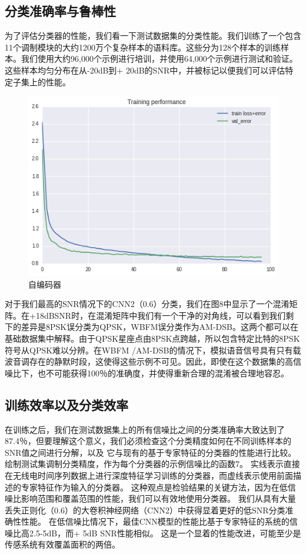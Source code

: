 \subsection{分类准确率与鲁棒性}
为了评估分类器的性能，我们看一下测试数据集的分类性能。我们训练了一个包含11个调制模块的大约1200万个复杂样本的语料库。这些分为128个样本的训练样本。我们使用大约96,000个示例进行培训，并使用64,000个示例进行测试和验证。 这些样本均匀分布在从-20dB到+ 20dB的SNR中，并被标记以便我们可以评估特定子集上的性能。\par
\begin{figure}[!h]
	\centering
	\includegraphics[scale=0.3]{figures/chapter_3/loss}
	\caption{自编码器}	\label{fig_3_2}
\end{figure}
对于我们最高的SNR情况下的CNN2（0.6）分类，我们在图8中显示了一个混淆矩阵。在+18dBSNR时，在混淆矩阵中我们有一个干净的对角线，可以看到我们剩下的差异是8PSK误分类为QPSK，WBFM误分类作为AM-DSB。这两个都可以在基础数据集中解释。由于QPSK星座点由8PSK点跨越，所以包含特定比特的8PSK符号从QPSK难以分辨。在WBFM /AM-DSB的情况下，模拟语音信号具有只有载波音调存在的静默时段，这使得这些示例不可见。因此，即使在这个数据集的高信噪比下，也不可能获得100％的准确度，并使得重新合理的混淆被合理地容忍。\par

\subsection{训练效率以及分类效率}

在训练之后，我们在测试数据集上的所有信噪比之间的分类准确率大致达到了87.4％，但要理解这个意义，我们必须检查这个分类精度如何在不同训练样本的SNR值之间进行分解，以及 它与现有的基于专家特征的分类器的性能进行比较。绘制测试集调制分类精度，作为每个分类器的示例信噪比的函数7。 实线表示直接在无线电时间序列数据上进行深度特征学习训练的分类器，而虚线表示使用前面描述的专家特征作为输入的分类器。 这种观点是检验结果的关键方法，因为在低信噪比影响范围和覆盖范围的性能，我们可以有效地使用分类器。 我们从具有大量丢失正则化（0.6）的大卷积神经网络（CNN2）中获得显着更好的低SNR分类准确性性能。 在低信噪比情况下，最佳CNN模型的性能比基于专家特征的系统的信噪比高2.5-5dB，而+ 5dB SNR性能相似。 这是一个显着的性能改进，可能至少是传感系统有效覆盖面积的两倍。\par

